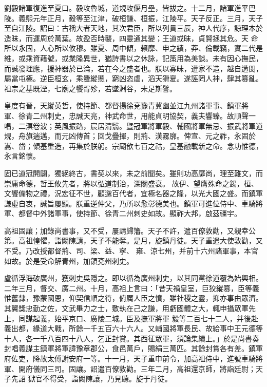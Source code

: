 \begin{pinyinscope}
 劉毅諸軍復進至夏口。毅攻魯城，道規攻偃月壘，皆拔之。十二月，諸軍進平巴陵。義熙元年正月，毅等至江津，破桓謙、桓振，江陵平。天子反正。三月，天子至自江陵。詔曰：古稱大者天地，其次君臣，所以列貫三辰，神人代序，諒理本於造昧，而運周於萬葉。故盈否時襲，四靈通其變；王道或昧，貞賢拯其危。天
 命所以永固，人心所以攸穆。雖夏、周中傾，賴靡、申之績，莽、倫載竊，實二代是維，或乘資藉號，或業隆異世，猶詩書以之休詠，記策用為美談。未有因心撫民，而誠發理應，援神器於已淪，若在今之盛者也。朕以寡昧，遭家不造，越自遘閔，屬當屯極。逆臣桓玄，乘釁縱慝，窮凶恣虐，滔天猾夏。遂誣罔人神，肆其篡亂。祖宗之基既湮，七廟之饗胥殄，若墜淵谷，未足斯譬。



 皇度有晉，天縱英哲，使持節、都督揚徐兗豫青冀幽並江九州諸軍事、鎮軍將
 軍、徐青二州刺史，忠誠天亮，神武命世，用能貞明協契，義夫響臻。故順聲一唱，二溟卷波；英風振路，宸居清翳。暨冠軍將軍毅、輔國將軍無忌、振武將軍道規，舟旗遄邁，而元凶傳首；回戈疊揮，則荊、漢霧廓。俾宣、元之祚，永固於嵩、岱；傾基重造，再集於朕躬。宗廟歆七百之祜，皇基融載新之命。念功惟德，永言銘懷。



 固已道冠開闢，獨絕終古，書契以來，未之前聞矣。雖則功高靡尚，理至難文，而崇庸命德，哲王攸先者，將以弘道制治，深關盛衰。
 故伊、望膺殊命之錫，桓、文饗備物之禮，況宏征不世，顧邈百代者，宜極名器之隆，以光大國之盛。而鎮軍謙虛自衷，誠旨屢顯。朕重逆仲父，乃所以愈彰德美也。鎮軍可進位侍中、車騎將軍、都督中外諸軍事，使持節、徐青二州刺史如故。顯祚大邦，啟茲疆宇。



 高祖固讓；加錄尚書事，又不受，屢請歸籓。天子不許，遣百僚敦勸，又親幸公第。高祖惶懼，詣闕陳請，天子不能奪。是月，旋鎮丹徒。天子重遣大使敦勸，又不受。乃改授都督荊、司、梁、益、寧、
 雍、涼七州，并前十六州諸軍事，本官如故。於是受命解青州，加領兗州刺史。



 盧循浮海破廣州，獲刺史吳隱之。即以循為廣州刺史，以其同黨徐道覆為始興相。二年三月，督交、廣二州。十月，高祖上言曰：「昔天禍皇室，巨狡縱篡，臣等義惟舊隸，豫蒙國恩，仰契信順之符，俯厲人臣之憤，雖社稷之靈，抑亦事由眾濟。其翼獎忠勤之佐，文武畢力之士，敷執在己之謙，用虧國體之大，輒申攝眾軍先上，同謀起義，始平京口、廣陵二城。臣及撫軍將軍
 毅等二百七十二人，并後赴義出都，緣道大戰，所餘一千五百六十六人。又輔國將軍長民、故給事中王元德等十人，各一千八百四十八人，乞正封賞。其西征眾軍，須論集續上。」於是尚書奏封唱義謀主鎮軍將軍諱豫章郡公，食邑萬戶，賜絹三萬匹。其餘封賞各有差。鎮軍府佐吏，降故太傅謝安府一等。十一月，天子重申前令，加高祖侍中，進號車騎將軍、開府儀同三司。固讓。詔遣百僚敦勸。三年二月，高祖還京師，將詣廷尉；天子先詔
 獄官不得受，詣闕陳讓，乃見聽。旋于丹徒。




\end{pinyinscope}
